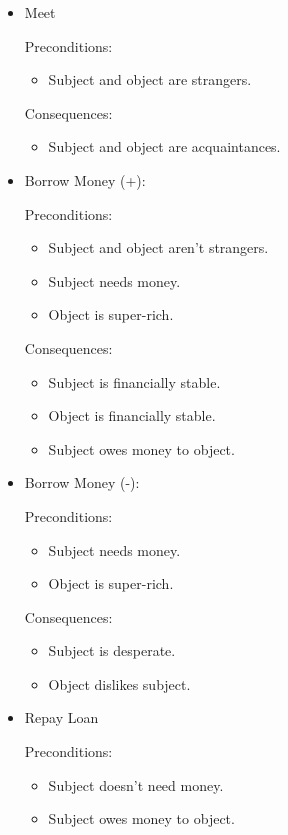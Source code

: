 \documentclass[12pt]{article}
\begin{document}
\begin{itemize}
  \item Meet

    Preconditions:
    \begin{itemize}
      \item Subject and object are strangers.
    \end{itemize}

    Consequences:
    \begin{itemize}
      \item Subject and object are acquaintances.
    \end{itemize}

  \item Borrow Money (+):

    Preconditions:
    \begin{itemize}
      \item Subject and object aren't strangers.
      \item Subject needs money.
      \item Object is super-rich.
    \end{itemize}

    Consequences:
    \begin{itemize}
      \item Subject is financially stable.
      \item Object is financially stable.
      \item Subject owes money to object.
    \end{itemize}

  \item Borrow Money (-):

    Preconditions:
    \begin{itemize}
      \item Subject needs money.
      \item Object is super-rich.
    \end{itemize}

    Consequences:
    \begin{itemize}
      \item Subject is desperate.
      \item Object dislikes subject.
    \end{itemize}

  \item Repay Loan

    Preconditions:
    \begin{itemize}
      \item Subject doesn't need money.
      \item Subject owes money to object.
    \end{itemize}


\end{itemize}
\end{document}
